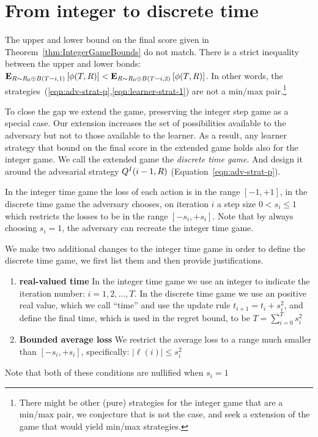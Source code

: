 \documentclass{article}[12pt]
\begin{document}
\section{From integer to discrete time}
\label{sec:discrete}

The upper and lower bound on the final score given in
Theorem~\ref{thm:IntegerGameBounds} do not match. There is a strict
inequality between the upper and lower
bonds:${\bf E}_{R \sim R_0 \oplus B(T-i,1)}\left[ \phi(T,R) \right] < {\bf E}_{R \sim R_0
  \oplus B(T-i,2)}\left[ \phi(T,R) \right]$. In other words, the
strategies~(\ref{eqn:adv-strat-p},\ref{eqn:learner-strat-1}) are not a
min/max pair.\footnote{There might be other (pure) strategies for the integer
game that are a min/max pair, we conjecture that is not the case, and
seek a extension of the game that would yield min/max strategies.}

To close the gap we extend the game, preserving the integer step game
as a special case. Our extension increases the set of possibilities
available to the adversary but not to those available to the learner. As a result, any
learner strategy that bound on the final score in the extended game holds also for the
integer game. We call the extended game the {\em discrete time
  game}. And design it around the advesarial strategy
$Q^I(i-1,R)$ (Equation~\ref{eqn:adv-strat-p}).

In the integer time game the loss of each action is in the range
$[-1,+1]$, in the discrete time game the adversary chooses, on
iteration $i$ a step size $0<s_i\leq 1$ which restricts the losses to
be in the range $[-s_i,+s_i]$. Note that by always choosing $s_i=1$,
the adversary can recreate the integer time game.

We make two additional changes to the integer time game in order to define
the discrete time game, we first list them and then provide justifications.
\begin{enumerate}
\item {\bf real-valued time} In the integer time game we use an
  integer to indicate the iteration number: $i=1,2,\ldots,T$. In the
  discrete time game we use an positive real value, which we call
  ``time'' and use the update rule $t_{i+1} = t_i + s_i^2$, and define
  the final time, which is used in the regret bound, to be
  $T=\sum_{i=0}^T s_i^2$
\item {\bf Bounded average loss} We restrict the average loss to a
  range much smaller than $[-s_i,+s_i]$, specifically:
  $|\ell(i)| \leq s_i^2$
\end{enumerate}
Note that both of these conditions are nullified when $s_i=1$
\end{document}
